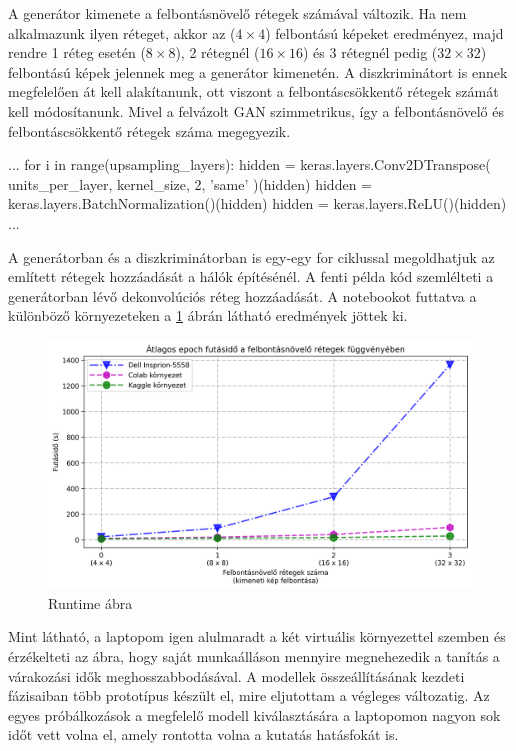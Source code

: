 A generátor kimenete a felbontásnövelő rétegek számával változik. Ha nem alkalmazunk ilyen réteget, akkor az ($4 \times 4$) felbontású képeket eredményez, majd rendre 1 réteg esetén ($8 \times 8$), 2 rétegnél ($16 \times 16$) és 3 rétegnél pedig ($32 \times 32$) felbontású képek jelennek meg a generátor kimenetén. A diszkriminátort is ennek megfelelően át kell alakítanunk, ott viszont a felbontáscsökkentő rétegek számát kell módosítanunk. Mivel a felvázolt GAN szimmetrikus, így a felbontásnövelő és felbontáscsökkentő rétegek száma megegyezik.

\begin{python}
...
for i in range(upsampling_layers):
    hidden = keras.layers.Conv2DTranspose(
        units_per_layer, kernel_size, 2, 'same'
    )(hidden)
    hidden = keras.layers.BatchNormalization()(hidden)
    hidden = keras.layers.ReLU()(hidden)
...
\end{python}

A generátorban és a diszkriminátorban is egy-egy for ciklussal megoldhatjuk az említett rétegek hozzáadását a hálók építésénél. A fenti példa kód szemlélteti a generátorban lévő dekonvolúciós réteg hozzáadását.
A notebookot futtatva a különböző környezeteken a \ref{fig:runtime} ábrán látható eredmények jöttek ki.

\begin{figure}[h]
\centering
\includegraphics[width=15cm]{images/runtime.png}
\caption{Runtime ábra}
\label{fig:runtime}
\end{figure}

Mint látható, a laptopom igen alulmaradt a két virtuális környezettel szemben és érzékelteti az ábra, hogy saját munkaálláson mennyire megnehezedik a tanítás a várakozási idők meghosszabbodásával. A modellek összeállításának kezdeti fázisaiban több prototípus készült el, mire eljutottam a végleges változatig. Az egyes próbálkozások a megfelelő modell kiválasztására a laptopomon nagyon sok időt vett volna el, amely rontotta volna a kutatás hatásfokát is.

